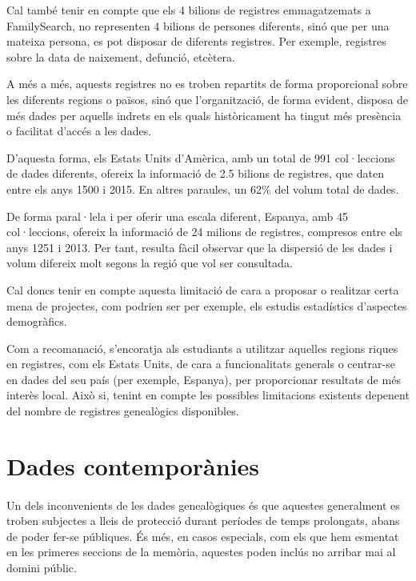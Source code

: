     Cal també tenir en compte que els 4 bilions de registres emmagatzemats a Family\-Search, no representen 4 bilions de persones diferents, sinó que per una mateixa persona, es pot disposar de diferents registres. Per exemple, registres sobre la data de naixement, defunció, etcètera.

    A més a més, aquests registres no es troben repartits de forma proporcional sobre les diferents regions o països, sinó que l'organització, de forma evident, disposa de més dades per aquells indrets en els quals històricament ha tingut més presència o facilitat d'accés a les dades.

     D'aquesta forma, els Estats Units d'Amèrica, amb un total de 991 col·leccions de dades diferents, ofereix la informació de 2.5 bilions de registres, que daten entre els anys 1500 i 2015. En altres paraules, un 62\% del volum total de dades.

     De forma paral·lela i per oferir una escala diferent, Espanya, amb 45 col·leccions, ofereix la informació de 24 milions de registres, compresos entre els anys 1251 i 2013. Per tant, resulta fàcil observar que la dispersió de les dades i volum difereix molt segons la regió que vol ser consultada.

     Cal doncs tenir en compte aquesta limitació de cara a proposar o realitzar certa mena de projectes, com podrien ser per exemple, els estudis estadístics d'aspectes demogràfics.

     Com a recomanació, s'encoratja als estudiants a utilitzar aquelles regions riques en registres, com els Estats Units, de cara a funcionalitats generals o centrar-se en dades del seu país (per exemple, Espanya), per proporcionar resultats de més interès local. Això si, tenint en compte les possibles limitacions existents depenent del nombre de registres genealògics disponibles.


 \section{Dades contemporànies}

    \paragraph{}
    Un dels inconvenients de les dades genealògiques és que aquestes generalment es troben subjectes a lleis de protecció durant períodes de temps prolongats, abans de poder fer-se públiques. És més, en casos especials, com els que hem esmentat en les primeres seccions de la memòria, aquestes poden inclús no arribar mai al domini públic.

